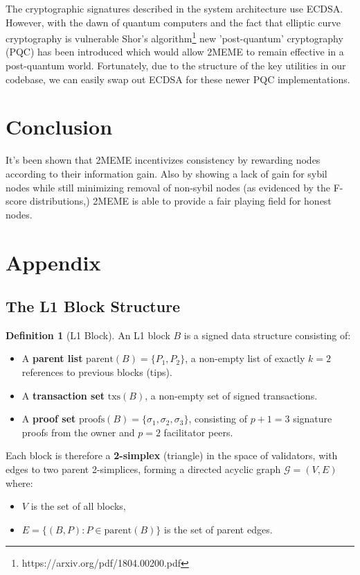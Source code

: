 \documentclass{article}
\theoremstyle{definition}
\newtheorem{definition}[theorem]{Definition}
\theoremstyle{remark}
\theoremstyle{plain}
\begin{document}
	The cryptographic signatures described in the system architecture use ECDSA. However, with the dawn of quantum computers and the fact that elliptic curve cryptography is vulnerable Shor's algorithm\footnote{https://arxiv.org/pdf/1804.00200.pdf} new 'post-quantum' cryptography (PQC) has been introduced which would allow 2MEME to remain effective in a post-quantum world. Fortunately, due to the structure of the key utilities in our codebase, we can easily swap out ECDSA for these newer PQC implementations. 

	
\section{Conclusion}
It's been shown that 2MEME incentivizes consistency by rewarding nodes according to their information gain. Also by showing a lack of gain for sybil nodes while still minimizing removal of non-sybil nodes (as evidenced by the F-score distributions,) 2MEME is able to provide a fair playing field for honest nodes.

\section{Appendix}
\subsection{The L1 Block Structure}

\begin{definition}[L1 Block]
An L1 block $B$ is a signed data structure consisting of:
\begin{itemize}
    \item A \textbf{parent list} $\mathrm{parent}(B) = \{P_1, P_2\}$, a non-empty list of exactly $k = 2$ references to previous blocks (tips).
    \item A \textbf{transaction set} $\mathrm{txs}(B)$, a non-empty set of signed transactions.
    \item A \textbf{proof set} $\mathrm{proofs}(B) = \{\sigma_1, \sigma_2, \sigma_3\}$, consisting of $p + 1 = 3$ signature proofs from the owner and $p = 2$ facilitator peers.
\end{itemize}
\end{definition}

Each block is therefore a \textbf{2-simplex} (triangle) in the space of validators, with edges to two parent 2-simplices, forming a directed acyclic graph $\mathcal{G} = (V, E)$ where:
\begin{itemize}
    \item $V$ is the set of all blocks,
    \item $E = \{(B, P) : P \in \mathrm{parent}(B)\}$ is the set of parent edges.
\end{itemize}
\end{document}
